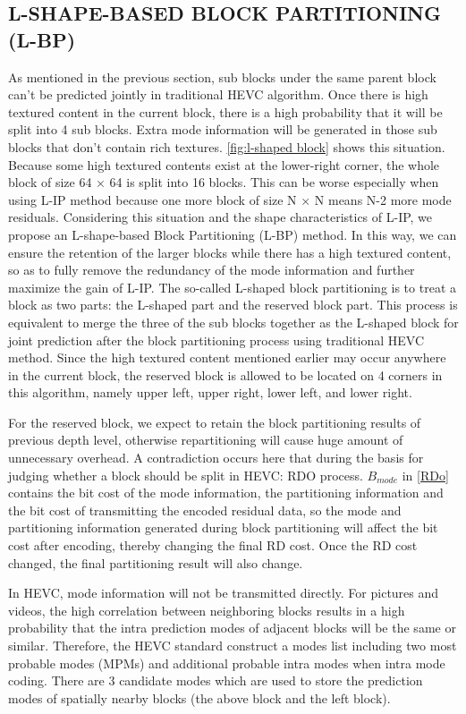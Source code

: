 \documentclass[journal]{IEEEtran}
\begin{document}
\subsection{L-SHAPE-BASED BLOCK PARTITIONING (L-BP)}
As mentioned in the previous section, sub blocks under the same parent block can't be predicted jointly in traditional HEVC algorithm. Once there is high textured content in the current block, there is a high probability that it will be split into 4 sub blocks. Extra mode information will be generated in those sub blocks that don't contain rich textures. \autoref{fig:l-shaped block} shows this situation. Because some high textured contents exist at the lower-right corner, the whole block of size 64 × 64 is split into 16 blocks. This can be worse especially when using L-IP method because one more block of size N × N means N-2 more mode residuals. Considering this situation and the shape characteristics of L-IP, we propose an L-shape-based Block Partitioning (L-BP) method. In this way, we can ensure the retention of the larger blocks while there has a high textured content, so as to fully remove the redundancy of the mode information and further maximize the gain of L-IP. The so-called L-shaped block partitioning is to treat a block as two parts: the L-shaped part and the reserved block part. This process is equivalent to merge the three of the sub blocks together as the L-shaped block for joint prediction after the block partitioning process using traditional HEVC method. Since the high textured content mentioned earlier may occur anywhere in the current block, the reserved block is allowed to be located on 4 corners in this algorithm, namely upper left, upper right, lower left, and lower right.

For the reserved block, we expect to retain the block partitioning results of previous depth level, otherwise repartitioning will cause huge amount of unnecessary overhead. A contradiction occurs here that during the basis for judging whether a block should be split in HEVC: RDO process. $B_{mode}$ in \autoref{RDo} contains the bit cost of the mode information, the partitioning information and the bit cost of transmitting the encoded residual data, so the mode and partitioning information generated during block partitioning will affect the bit cost after encoding, thereby changing the final RD cost. Once the RD cost changed, the final partitioning result will also change. 

In HEVC, mode information will not be transmitted directly. For pictures and videos, the high correlation between neighboring blocks results in a high probability that the intra prediction modes of adjacent blocks will be the same or similar. Therefore, the HEVC standard construct a modes list including two most probable modes (MPMs) and additional probable intra modes when intra mode coding\cite{18}. There are 3 candidate modes which are used to store the prediction modes of spatially nearby blocks (the above block and the left block). 
\end{document}
